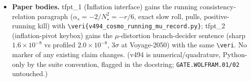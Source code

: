 \documentclass[11pt]{article}
\begin{document}
\begin{itemize}[leftmargin=1.5em]
gains the two rows ($\alpha_s$ \mC\ with the $-1.33\sigma$ P-ACT-LB pull and the positive-running kill;
$\mu$-distortion \mC\ data-limited with the Voyage-2050 branch split); website \texttt{lib/predictions.ts}
gains the matching cards \texttt{alpha-s-running} and \texttt{mu-distortion} (confrontation $+$ experiment
blocks pointing at \texttt{experiments/tfpt-discovery}); the cosmology DAG node lists \texttt{v494} and
states the running/$\mu$ readouts.
\item \textbf{Paper bodies.} tfpt\_1 (Inflation interface) gains the running consistency-relation paragraph
($\alpha_s=-2/N_\star^2=-r/6$, exact slow roll, pulls, positive-running kill) with
\texttt{\textbackslash veri\{v494\_cosmo\_running\_mu\_record.py\}}; tfpt\_2 (inflation-pivot keybox) gains
the $\mu$-distortion branch-decider sentence (sharp $1.6\times10^{-8}$ vs profiled $2.0\times10^{-8}$,
$3\sigma$ at Voyage-2050) with the same \texttt{\textbackslash veri}. No marker of any existing claim
changes. (v494 is numerical/quadrature, Python-only by the suite convention, flagged in the docstring;
\texttt{GATE.WOLFRAM.01/02} untouched.)
\end{itemize}
\end{document}
